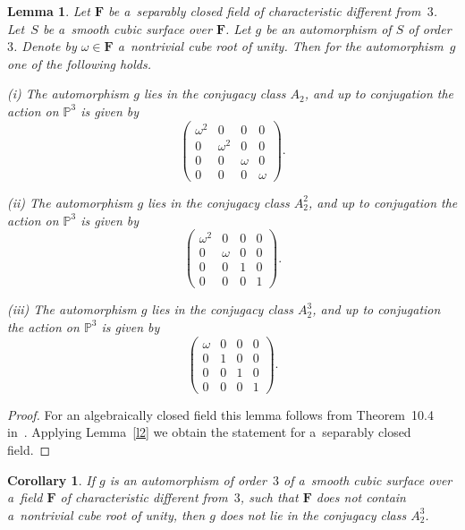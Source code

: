 \documentclass{amsart}
\numberwithin{equation}{section}
\theoremstyle{plain}
\newtheorem{lemma}{Lemma}
\newtheorem{corollary}{Corollary}
\theoremstyle{definition}
\theoremstyle{remark}
\begin{document}
\begin{lemma}
\label{l15}
Let $\mathbf{F}$ be a~separably closed field of characteristic different from~$3$. Let~$S$ be a~smooth cubic surface over $\mathbf{F}$. Let $g$ be an automorphism of $S$ of order~$3$. Denote by $\omega \in \mathbf{F}$ a~nontrivial cube root of unity. Then for the automorphism~$g$ one of the following holds.

{\rm (i)} The automorphism $g$ lies in the conjugacy class $A_2$, and up to conjugation the action on $\mathbb{P}^3$ is given by
$$
\begin{pmatrix}
\omega^2 & 0 & 0 & 0\\
0 & \omega^2 & 0 & 0\\
0 & 0 & \omega & 0\\
0 & 0 & 0 & \omega
\end{pmatrix}.
$$

{\rm (ii)} The automorphism $g$ lies in the conjugacy class $A_2^2$, and up to conjugation the action on $\mathbb{P}^3$ is given by
$$
\begin{pmatrix}
\omega^2 & 0 & 0 & 0\\
0 & \omega & 0 & 0\\
0 & 0 & 1 & 0\\
0 & 0 & 0 & 1
\end{pmatrix}.
$$

{\rm (iii)} The automorphism $g$ lies in the conjugacy class $A_2^3$, and up to conjugation the action on $\mathbb{P}^3$ is given by
$$
\begin{pmatrix}
\omega & 0 & 0 & 0\\
0 & 1 & 0 & 0\\
0 & 0 & 1 & 0\\
0 & 0 & 0 & 1
\end{pmatrix}.
$$
\end{lemma}

\begin{proof}
For an algebraically closed field this lemma follows from Theorem~10.4 in~\cite{8}. Applying Lemma~\ref{l2} we obtain the statement for a~separably closed field.
\end{proof}

\begin{corollary}
\label{c2}
If $g$ is an automorphism of order~$3$ of a~smooth cubic surface over a~field $\mathbf{F}$ of characteristic different from~$3$, such that $\mathbf{F}$ does not contain a~nontrivial cube root of unity, then $g$ does not lie in the conjugacy class $A_2^3$.
\end{corollary}
\end{document}
